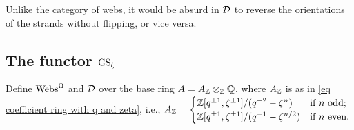 \begin{remark} Unlike the category of webs, it would be absurd in $\mathcal{D}$ to reverse the orientations of the strands without flipping, or vice versa. \end{remark}

\subsection{The functor \texorpdfstring{$\operatorname{GS}_{\zeta}$}{GS\_zeta}}\label{subsec the functor}


Define $\operatorname{Webs}^{\Omega}$ and $\mathcal{D}$ over the base ring $A=A_{\mathbb{Z}}\otimes_{\mathbb{Z}} \mathbb{Q}$,  
where $A_{\mathbb{Z}}$ is as in \cref{eq coefficient ring with q and zeta}, i.e.,
$A_{\mathbb{Z}}= \begin{cases}
\mathbb{Z}[q^{\pm 1}, \zeta^{\pm 1}]/(q^{-2}-\zeta^n) &\text{if $n$ odd;}\\
\mathbb{Z}[q^{\pm 1}, \zeta^{\pm 1}]/(q^{-1}-\zeta^{n/2}) &\text{if $n$ even.}
    \end{cases}$
    
